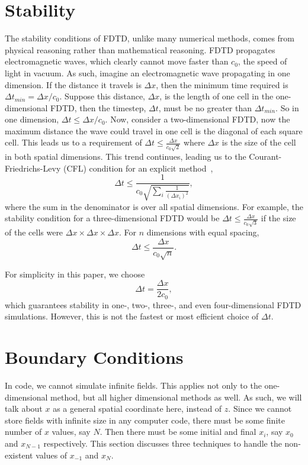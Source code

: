 \documentclass[12pt]{article}
\begin{document}
\begin{multicols}{2}
\section{Stability}
The stability conditions of FDTD, unlike many numerical methods, comes from physical reasoning rather than mathematical reasoning. FDTD propagates electromagnetic waves, which clearly cannot move faster than $c_0$, the speed of light in vacuum. As such, imagine an electromagnetic wave propagating in one dimension. If the distance it travels is $\Delta x$, then the minimum time required is $\Delta t_{\textit{min}} = \Delta x/c_0$. Suppose this distance, $\Delta x$, is the length of one cell in the one-dimensional FDTD, then the timestep, $\Delta t$, must be no greater than $\Delta t_\textit{min}$. So in one dimension, $\Delta t \leq \Delta x/c_0$. Now, consider a two-dimensional FDTD, now the maximum distance the wave could travel in one cell is the diagonal of each square cell. This leads us to a requirement of $\Delta t \leq \frac{\Delta x}{c_0\sqrt{2}}$ where $\Delta x$ is the size of the cell in both spatial dimensions. This trend continues, leading us to the Courant-Friedrichs-Levy (CFL) condition for an explicit method~\cite{Courant28},
\begin{equation}
\Delta t \leq \frac{1}{c_0\sqrt{\sum_i\frac{1}{(\Delta x_i)^2}}},
\end{equation}
where the sum in the denominator is over all spatial dimensions. For example, the stability condition for a three-dimensional FDTD would be $\Delta t \leq \frac{\Delta x}{c_0\sqrt{3}}$ if the size of the cells were $\Delta x \times \Delta x \times \Delta x$. For $n$ dimensions with equal spacing,
\begin{equation}
\Delta t \leq \frac{\Delta x}{c_0\sqrt{n}}.
\end{equation}

For simplicity in this paper, we choose
\begin{equation}
\label{eq:deltat}
\Delta t = \frac{\Delta x}{2 c_0},
\end{equation}
which guarantees stability in one-, two-, three-, and even four-dimensional FDTD simulations. However, this is not the fastest or most efficient choice of $\Delta t$.

\section{Boundary Conditions}
In code, we cannot simulate infinite fields. This applies not only to the one-dimensional method, but all higher dimensional methods as well. As such, we will talk about $x$ as a general spatial coordinate here, instead of $z$. Since we cannot store fields with infinite size in any computer code, there must be some finite number of $x$ values, say $N$. Then there must be some initial and final $x_i$, say $x_0$ and $x_{N-1}$ respectively. This section discusses three techniques to handle the non-existent values of $x_{-1}$ and $x_{N}$.

\end{multicols}
\end{document}
